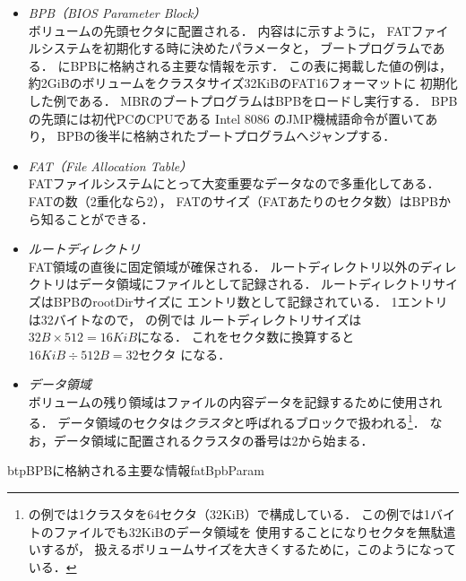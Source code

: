 \begin{itemize}
\item \emph{BPB（BIOS Parameter Block）}\\
  ボリュームの先頭セクタに配置される．
  内容はに示すように，
  FATファイルシステムを初期化する時に決めたパラメータと，
  ブートプログラムである．
  にBPBに格納される主要な情報を示す．
  この表に掲載した値の例は，
  約2GiBのボリュームをクラスタサイズ32KiBのFAT16フォーマットに
  初期化した例である．
  MBRのブートプログラムはBPBをロードし実行する．
  BPBの先頭には初代PCのCPUである Intel 8086 のJMP機械語命令が置いてあり，
  BPBの後半に格納されたブートプログラムへジャンプする．

\item \emph{FAT（File Allocation Table）}\\
  FATファイルシステムにとって大変重要なデータなので多重化してある．
  FATの数（2重化なら2），
  FATのサイズ（FATあたりのセクタ数）はBPBから知ることができる．

\item \emph{ルートディレクトリ}\\
  FAT領域の直後に固定領域が確保される．
  ルートディレクトリ以外のディレクトリはデータ領域にファイルとして記録される．
  ルートディレクトリサイズはBPBのrootDirサイズに
  エントリ数として記録されている．
  1エントリは32バイトなので，
  の例では
  ルートディレクトリサイズは$32B \times 512 = 16KiB$になる．
  これをセクタ数に換算すると$16KiB \div 512B = 32セクタ$ になる．

\item \emph{データ領域}\\
  ボリュームの残り領域はファイルの内容データを記録するために使用される．
  データ領域のセクタは\emph{クラスタ}と呼ばれるブロックで扱われる\footnote{
    の例では1クラスタを64セクタ（32KiB）で構成している．
    この例では1バイトのファイルでも32KiBのデータ領域を
    使用することになりセクタを無駄遣いするが，
    扱えるボリュームサイズを大きくするために，このようになっている．}．
  なお，データ領域に配置されるクラスタの番号は2から始まる．
\end{itemize}

\begin{mytable}{btp}{BPBに格納される主要な情報}{fatBpbParam}
\end{mytable}

